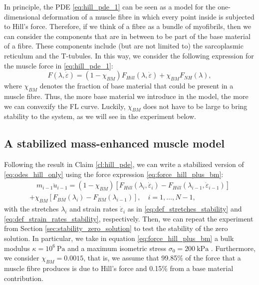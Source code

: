 \documentclass{sfuthesis}
\numberwithin{equation}{section}
\numberwithin{figure}{chapter}
\numberwithin{table}{chapter}
\theoremstyle{definition}
\newcommand{\depsilon}{\dot{\varepsilon}}
\begin{document}
In principle, the PDE \eqref{eq:hill_pde_1} can be seen as a model for the one-dimensional deformation of a muscle fibre in which every point inside is subjected to Hill's force. Therefore, if we think of a fibre as a bundle of myofibrils, then we can consider the components that are in between to be part of the base material of a fibre. These components include (but are not limited to) the sarcoplasmic reticulum and the T-tubules. In this way, we consider the following expression for the muscle force in \eqref{eq:hill_pde_1}:
\begin{equation} \label{eq:force_hill_plus_bm}
    F(\lambda, \depsilon) = (1-\chi_{BM}) F_{Hill}(\lambda, \depsilon) + \chi_{BM} F_{NH}(\lambda),
\end{equation}
where $\chi_{BM}$ denotes the fraction of base material that could be present in a muscle fibre. Thus, the more base material we introduce in the model, the more we can convexify the FL curve. Luckily, $\chi_{BM}$ does not have to be large to bring stability to the system, as we will see in the experiment below.

\subsection{A stabilized mass-enhanced muscle model} \label{sec:stabilized_muscle_model_1d}

Following the result in Claim \ref{cl:hill_pde}, we can write a stabilized version of \eqref{eq:odes_hill_only} using the force expression \eqref{eq:force_hill_plus_bm}:
\begin{multline} \label{eq:odes_hill_stabilized}
    \quad m_{i-1} \ddot{u}_{i-1} =
    (1-\chi_{BM})\left[ F_{Hill}(\lambda_i, \depsilon_i) - F_{Hill}(\lambda_{i-1}, \depsilon_{i-1}) \right] \\ 
    + \chi_{BM}\left[ F_{BM}(\lambda_i) - F_{BM}(\lambda_{i-1}) \right], \quad i = 1,\dots,N-1, \quad 
\end{multline}
with the stretches $\lambda_i$ and strain rates $\depsilon_i$ as in \eqref{eq:def_stretches_stability} and \eqref{eq:def_strain_rates_stability}, respectively. Then, we can repeat the experiment from Section \ref{sec:stability_zero_solution} to test the stability of the zero solution. In particular, we take in equation \eqref{eq:force_hill_plus_bm} a bulk modulus $\kappa = 10^6 \ \text{Pa}$ and a maximum isometric stress $\sigma_0 = 200 \ \text{kPa}$ \cite{AlmonacidEtAl2022_SIAP_Paper}. Furthermore, we consider $\chi_{BM} = 0.0015$, that is, we assume that 99.85\% of the force that a muscle fibre produces is due to Hill's force and 0.15\% from a base material contribution. 
\end{document}
